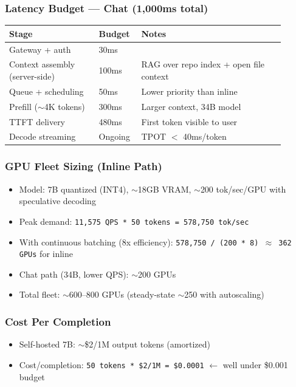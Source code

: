 \subsubsection*{Latency Budget --- Chat (1,000ms total)}

\begin{tabular}{|p{0.30\linewidth}|p{0.12\linewidth}|p{0.48\linewidth}|}
\hline
\textbf{Stage} & \textbf{Budget} & \textbf{Notes} \\
\hline
Gateway + auth & 30ms & \\
\hline
Context assembly (server-side) & 100ms & RAG over repo index + open file context \\
\hline
Queue + scheduling & 50ms & Lower priority than inline \\
\hline
Prefill ($\sim$4K tokens) & 300ms & Larger context, 34B model \\
\hline
TTFT delivery & 480ms & First token visible to user \\
\hline
Decode streaming & Ongoing & TPOT $<$ 40ms/token \\
\hline
\end{tabular}

\subsubsection*{GPU Fleet Sizing (Inline Path)}

\begin{itemize}
  \item Model: 7B quantized (INT4), $\sim$18GB VRAM, $\sim$200 tok/sec/GPU with speculative decoding
  \item Peak demand: \texttt{11,575 QPS * 50 tokens = 578,750 tok/sec}
  \item With continuous batching (8x efficiency): \texttt{578,750 / (200 * 8) $\approx$ 362 GPUs} for inline
  \item Chat path (34B, lower QPS): $\sim$200 GPUs
  \item Total fleet: $\sim$600--800 GPUs (steady-state $\sim$250 with autoscaling)
\end{itemize}

\subsubsection*{Cost Per Completion}

\begin{itemize}
  \item Self-hosted 7B: $\sim$\$2/1M output tokens (amortized)
  \item Cost/completion: \texttt{50 tokens * \$2/1M = \$0.0001} $\leftarrow$ well under \$0.001 budget
\end{itemize}

